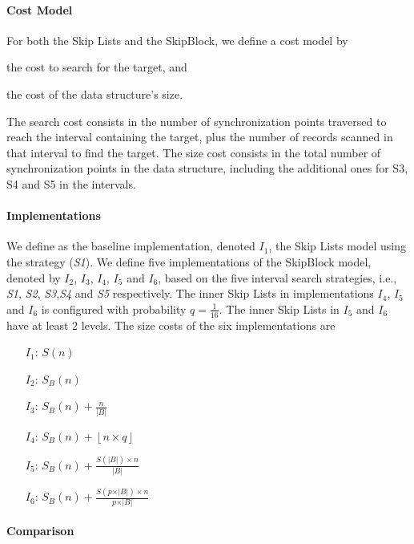 \paragraph{Cost Model}
\label{sec:skipblock-cost-model}
For both the Skip Lists and the SkipBlock, we define a cost model by
\begin{inparaenum}[(a)]
\item the cost to search for the target, and
\label{cost-search}
\item the cost of the data structure's size.
\label{cost-size}
\end{inparaenum}
The search cost consists in the number of synchronization points traversed to
reach the interval containing the target, plus the number of records scanned
in that interval to find the target. The size cost consists in the total number
of synchronization points in the data structure, including the additional ones
for S3, S4 and S5 in the intervals.

\paragraph{Implementations}
\label{sec:impl} 
We define as the baseline implementation, denoted $I_1$, the Skip
Lists model using the strategy (\emph{S1}). We define
five implementations of the SkipBlock model, denoted by $I_2$, $I_3$,
$I_4$, $I_5$ and $I_6$, based on the five interval search strategies, i.e.,
\emph{S1}, \emph{S2}, \emph{S3},\emph{S4} and \emph{S5} respectively. The
inner Skip Lists in implementations $I_4$, $I_5$ and $I_6$ is
configured with probability $q=\frac{1}{16}$. The inner Skip Lists in $I_5$ and
$I_6$ have at least 2 levels. The size costs of the six implementations are 
\begin{itemize}
  \item[$I_1$:] $S(n)$
  \item[$I_2$:] $S_B(n)$
  \item[$I_3$:] $S_B(n)+\frac{n}{\vert B \vert}$
  \item[$I_4$:] $S_B(n)+\left\lfloor n\times q\right\rfloor$
  \item[$I_5$:] $S_B(n)+\frac{S(\vert B \vert)\times n}{\vert B \vert}$  
  \item[$I_6$:]$S_B(n)+\frac{S(p\times\vert B \vert)\times n}{p\times\vert B
  \vert}$
\end{itemize}

\paragraph{Comparison}

